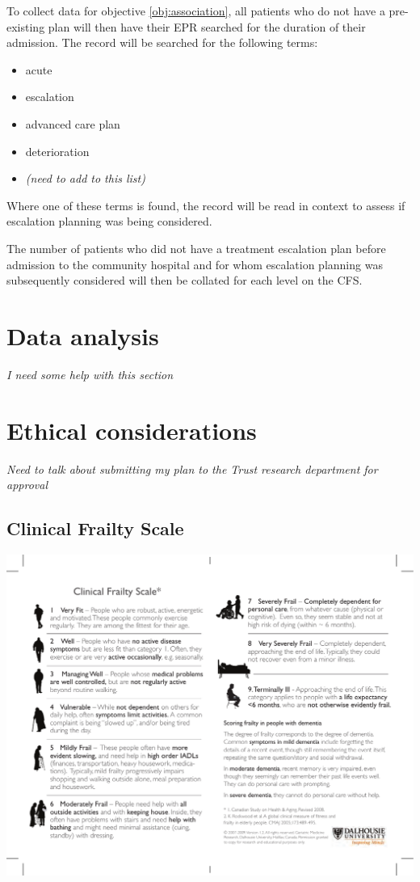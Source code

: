 \documentclass
[
	12pt,
	a4paper,
	oneside,
]{article}
\begin{document}
To collect data for objective \ref{obj:association}, all patients who do not have
a pre-existing plan will then have their EPR searched
for the duration of their admission. The record will be searched for the following
terms:

\begin{itemize}
\item acute
\item escalation
\item advanced care plan
\item deterioration
\item \emph{(need to add to this list)}
\end{itemize}

Where one of these terms is found, the record will be read in context to assess if 
escalation planning was being considered.

The number of patients who did not have a treatment escalation plan before admission
to the community hospital and for whom escalation planning was subsequently considered will then be 
collated for each level on the CFS.

\section{Data analysis}
\emph{I need some help with this section}

\section{Ethical considerations}
\emph {Need to talk about submitting my plan to the Trust research department for
	approval }
\clearpage
\printbibliography[prenote=needsfixing]

\clearpage
\begin{appendix}
\section{Clinical Frailty Scale}
\label{appendix:CFS}
\includegraphics[width=\textwidth]{CFS}
\end{appendix}
\end{document}
